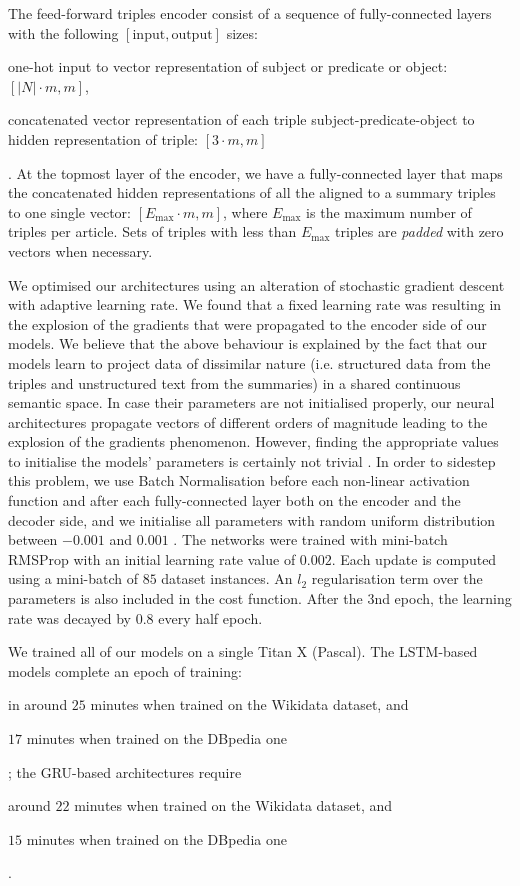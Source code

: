 \documentclass[preprint,5p]{elsarticle}
\begin{document}
The feed-forward triples encoder consist of a sequence of fully-connected layers with the following $[\text{input}, \text{output}]$ sizes: \begin{inparaenum}[(i)]\item one-hot input to vector representation of subject or predicate or object: $[|N| \cdot m, m]$, \item concatenated vector representation of each triple subject-predicate-object to hidden representation of triple: $[3 \cdot m, m]$\end{inparaenum}. At the topmost layer of the encoder, we have a fully-connected layer that maps the concatenated hidden representations of all the aligned to a summary triples to one single vector: $[E_{\max} \cdot m, m]$, where $E_{\max}$ is the maximum number of triples per article. Sets of triples with less than $E_{\max}$ triples are \textit{padded} with zero vectors when necessary.


We optimised our architectures using an alteration of stochastic gradient descent with adaptive learning rate. We found that a fixed learning rate was resulting in the explosion of the gradients that were propagated to the encoder side of our models. We believe that the above behaviour is explained by the fact that our models learn to project data of dissimilar nature (i.e. structured data from the triples and unstructured text from the summaries) in a shared continuous semantic space. In case their parameters are not initialised properly, our neural architectures propagate vectors of different orders of magnitude leading to the explosion of the gradients phenomenon. However, finding the appropriate values to initialise the models' parameters is certainly not trivial \cite{Ioffe2015}. In order to sidestep this problem, we use Batch Normalisation before each non-linear activation function and after each fully-connected layer both on the encoder and the decoder side, and we initialise all parameters with random uniform distribution between $-0.001$ and $0.001$ \cite{Ioffe2015}. The networks were trained with mini-batch RMSProp with an initial learning rate value of $0.002$. Each update is computed using a mini-batch of $85$ dataset instances. An $l_2$ regularisation term over the parameters is also included in the cost function. After the $3$nd epoch, the learning rate was decayed by $0.8$ every half epoch.

We trained all of our models on a single Titan X (Pascal). The LSTM-based models complete an epoch of training: \begin{inparaenum}[(i)]\item in around $25$ minutes when trained on the Wikidata dataset, and \item $17$ minutes when trained on the DBpedia one\end{inparaenum}; the GRU-based architectures require \begin{inparaenum}[(i)]\item around $22$ minutes when trained on the Wikidata dataset, and \item $15$ minutes when trained on the DBpedia one\end{inparaenum}.
\end{document}
